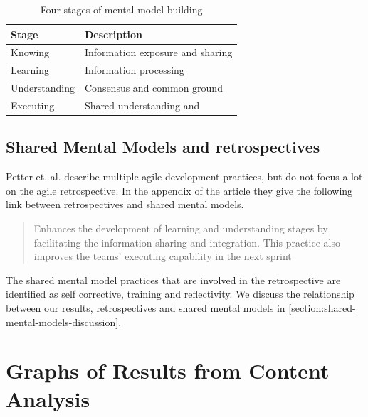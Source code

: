 \begin{table}[!h]
	\begin{centering}
	\caption{Four stages of mental model building}
	\label{table:stages-mental-model}
	\begin{tabular}{l | p{}}

	\hline
	Stage & Description \\
	\hline
	Knowing &  Information exposure and sharing\\
	Learning & Information processing \\
	Understanding & Consensus and common ground \\
	Executing & Shared understanding and  \\
	\hline
	
\end{tabular}
\end{centering}
\end{table}

	
\section{Shared Mental Models and retrospectives}

Petter et. al. \cite{Petter2013} describe multiple agile development practices, but do not focus a lot on the agile retrospective. In the appendix of the article they give the following link between retrospectives and shared mental models.

\begin{quote}
Enhances the development of learning and understanding stages by facilitating the information sharing and integration. This practice also improves the teams’ executing capability in the next sprint
\end{quote}

The shared mental model practices that are involved in the retrospective are identified as self corrective, training and reflectivity. We discuss the relationship between our results, retrospectives and shared mental models in \autoref{section:shared-mental-models-discussion}.

\chapter{Graphs of Results from Content Analysis}

